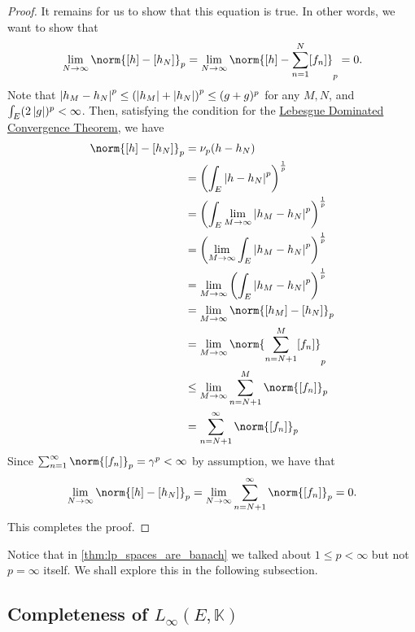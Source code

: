 \documentclass[notoc,notitlepage]{tufte-book}
\begin{document}
\begin{proof}
  \noindent
   It remains for us to show that
  this equation is true. In other words, we want to show that
  \begin{equation*}
    \lim_{N \to \infty} \norm{[h] - [h_N]}_p = \lim_{N \to \infty} \norm{[h] -
    \sum_{n=1}^{N} [f_n]}_p = 0.
  \end{equation*}
  Note that $\left|h_M - h_N\right|^p \leq \left( \left|h_M\right| + \left|h_N\right| \right)^p \leq
  (g + g)^p$ for any $M, N$, and $\int_{E} (2 \left|g\right|)^p < \infty$. Then,
  satisfying the condition for the
  \hyperref[thm:lebesgue_dominated_convergence_theorem]{Lebesgue Dominated
  Convergence Theorem}, we have
  \begin{align*}
    \norm{[h] - [h_N]}_p
    &= \nu_p(h - h_N) \\
    &= \left( \int_{E} \abs{h - h_N}^p \right)^{\frac{1}{p}} \\
    &= \left( \int_{E} \lim_{M \to \infty} \abs{h_M - h_N}^p
      \right)^{\frac{1}{p}} \\
    &= \left( \lim_{M \to \infty} \int_{E} \abs{h_M - h_N}^p
      \right)^{\frac{1}{p}} \\
    &= \lim_{M \to \infty} \left( \int_{E} \abs{h_M - h_N}^p
      \right)^{\frac{1}{p}} \\
    &= \lim_{M \to \infty} \norm{[h_M] - [h_N]}_p \\
    &= \lim_{M \to \infty} \norm{\sum_{n = N + 1}^{M} [f_n]}_p \\
    &\leq \lim_{M \to \infty} \sum_{n=N+1}^{M} \norm{[f_n]}_p \\
    &= \sum_{n=N+1}^{\infty} \norm{[f_n]}_p
  \end{align*}
  Since $\sum_{n=1}^{\infty} \norm{[f_n]}_p = \gamma^p < \infty$ by assumption,
  we have that
  \begin{equation*}
    \lim_{N \to \infty} \norm{[h] - [h_N]}_p = \lim_{N \to \infty}
    \sum_{n=N+1}^{\infty} \norm{[f_n]}_p = 0.
  \end{equation*}
  This completes the proof.
\end{proof}

Notice that in \cref{thm:lp_spaces_are_banach} we talked about $1 \leq p <
\infty$ but not $p = \infty$ itself. We shall explore this in the following
subsection.

\subsection{Completeness of \texorpdfstring{$L_\infty(E, \mathbb{K})$}{Linfty(E, K)}}%
\label{sub:completeness_of_l_infty_e_k_}
\end{document}
